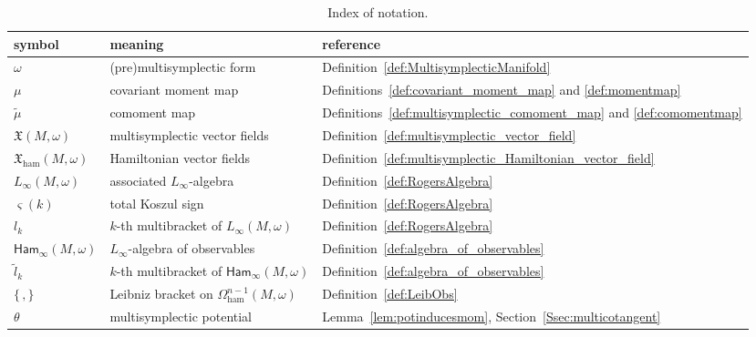 \documentclass[pdftex]{sigma}
\numberwithin{equation}{section}
\newcommand{\g}{\mathfrak{g}}
\newcommand{\Ham}{\mathsf{Ham}}
\newcommand{\ham}{\text{ham}}
\newcommand{\X}{\mathfrak{X}}
\begin{document}
\begin{table}[t]
	\centering\renewcommand{\arraystretch}{1.22}
	\caption{Index of notation.}	\label{tab:symbols}

\vspace{1mm}

	\begin{tabular}{lll}
 \hline
		symbol			&meaning			&reference		\\ \hline%
		$\omega$		&(pre)multisymplectic form		&Definition~\ref{def:MultisymplecticManifold}		\\
		$\mu$			&covariant moment map			&Definitions~\ref{def:covariant_moment_map} and \ref{def:momentmap}		\\
		$\widetilde\mu$		&comoment map				&Definitions~\ref{def:multisymplectic_comoment_map} and \ref{def:comomentmap}		\\
		$\X(M,\omega)$		&multisymplectic vector fields		&Definition~\ref{def:multisymplectic_vector_field}			\\
		$\X_\ham(M,\omega)$	&Hamiltonian vector fields		&Definition~\ref{def:multisymplectic_Hamiltonian_vector_field}	\\
		$L_\infty(M,\omega)$	&associated $L_\infty$-algebra		&Definition~\ref{def:RogersAlgebra}			\\
		$\varsigma(k)$		&total Koszul sign			&Definition~\ref{def:RogersAlgebra}	\\
		$l_k$			&$k$-th multibracket of $L_\infty(M,\omega)$	&Definition~\ref{def:RogersAlgebra}	\\
		$\Ham_\infty(M,\omega)$	&$L_\infty$-algebra of observables
										&Definition~\ref{def:algebra_of_observables}	\\
		$\tilde{l}_k$		&$k$-th multibracket of 	$\Ham_\infty(M,\omega)$	&Definition~\ref{def:algebra_of_observables}	\\
		$\{\,,\}$		&Leibniz bracket on $\Omega_\ham^{n-1}(M,\omega)$	&Definition~\ref{def:LeibObs}	\\
		$\theta$		&multisymplectic potential		&Lemma~\ref{lem:potinducesmom}, Section~\ref{Ssec:multicotangent}	\\

\end{tabular}
\end{table}
\end{document}
